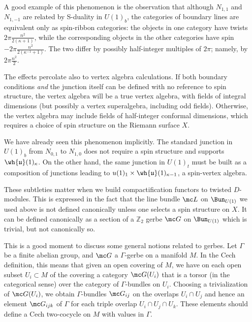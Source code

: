 \documentclass[11pt,reqno]{amsart}
\theoremstyle{plain}
\numberwithin{equation}{section}
\newcommand{\Z}{\mathbb{Z}}
\theoremstyle{definition}
\begin{document}
A good example of this phenomenon is the observation that although
$N_{1,1}$ and $N_{1,-1}$ are related by S-duality in $U(1)_b$, the
categories of boundary lines are equivalent only as spin-ribbon
categories: the objects in one category have twists $2 \pi
\frac{n^2}{2 (\kappa+1)}$, while the corresponding objects in the
other categories have spin $-2 \pi \frac{n^2}{2 (\kappa^{-1}+1)}$. The
two differ by possibly half-integer multiples of $2\pi$; namely, by
$2 \pi \frac{n^2}{2}$.

The effects percolate also to vertex algebra calculations. If both
boundary conditions {\it and} the junction itself can be defined with
no reference to spin structure, the vertex algebra will be a true
vertex algebra, with fields of integral dimensions (but possibly a
vertex superalgebra, including odd fields). Otherwise, the vertex
algebra may include fields of half-integer conformal dimensions,
which requires a choice of spin structure on the Riemann surface $X$.

We have already seen this phenomenon implicitly. The standard junction
in $U(1)_b$ from $N_{0,1}$ to $N_{1,0}$ does not require a spin
structure and supports $\wh{\mathfrak{u}}(1)_\kappa$.  On the other
hand, the same junction in $U(1)_t$ must be built as a composition of
junctions leading to $u(1)_1 \times \wh{\mathfrak{u}}(1)_{\kappa-1}$,
a spin-vertex algebra.

These subtleties matter when we build compactification functors to
twisted $D$-modules. This is expressed in the fact that the line
bundle ${\mc L}$ on $\Bun_{U(1)}$ we used above is not defined
canonically unless one selects a spin structure on $X$. It can be
defined canonically as a section of a $\Z_2$ gerbe ${\mc G}$ on
$\Bun_{U(1)}$ which is trivial, but not canonically so.

This is a good moment to discuss some general notions related to
gerbes. Let $\Gamma$ be a finite abelian group, and ${\mc G}$ a
$\Gamma$-gerbe on a manifold $M$. In the Cech definition, this means
that given an open covering of $M$, we have on each open subset $U_i
\subset M$ of the covering a category ${\mc G}(U_i)$ that is a torsor
(in the categorical sense) over the category of $\Gamma$-bundles on
$U_i$. Choosing a trivialization of ${\mc G}(U_i)$, we obtain
$\Gamma$-bundles ${\mc G}_{ij}$ on the overlaps $U_i \cap U_j$ and
hence an element ${\mc G}_{ijk}$ of $\Gamma$ for each triple overlap
$U_i \cap U_j \cap U_k$. These elements should define a Cech
two-cocycle on $M$ with values in $\Gamma$.
\end{document}
